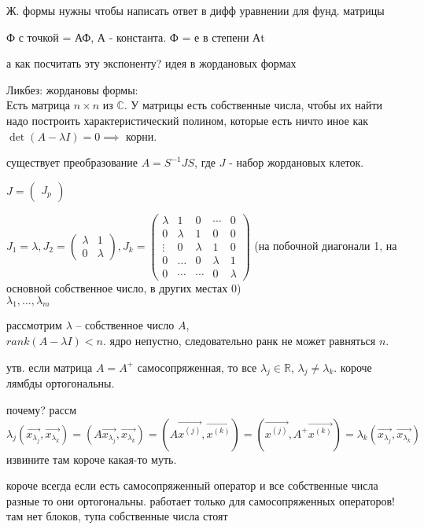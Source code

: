 \documentclass[12pt, a4paper]{article}
\begin{document}
Ж. формы нужны чтобы написать ответ в дифф уравнении для фунд. матрицы

Ф с точкой = АФ, А - константа. Ф = е в степени Аt

а как посчитать эту экспоненту? идея в жордановых формах

Ликбез: жордановы формы:\\

Есть матрица $n\times n$ из $\mathbb{C}$. У матрицы есть собственные числа, чтобы их найти надо построить характеристический полином, которые есть ничто иное как $\det (A - \lambda I) = 0 \implies $ корни. 

существует преобразование $A = S^{-1}JS$, где $J$ - набор жордановых клеток.

$J = \left(
\begin{matrix}
J_{p} 
\end{matrix}
\right)
$

$J_1 = \lambda, J_2 = \left(\begin{matrix}
\lambda & 1 \\ 0 & \lambda
\end{matrix}\right), J_k = \left(\begin{matrix}
\lambda & 1 & 0 & \cdots & 0 \\ 
0 & \lambda & 1 & 0 & 0\\
\vdots & 0 & \lambda & 1 & 0\\
0 & \dotsc & 0 & \lambda & 1 \\
0 & \cdots & \cdots & 0 & \lambda
\end{matrix}\right)$ (на побочной диагонали 1, на основной собственное число, в других местах 0)\\

$\lambda_1, \dotsc, \lambda_m$

рассмотрим $\lambda$ -- собственное число $A$,\\
 $rank(A-\lambda I) < n$. ядро непустно, следовательно ранк не может равняться $n$.
 
утв. если матрица $A=A^+$ самосопряженная, то все $\lambda_j \in \mathbb{R}$, $\lambda_j \neq \lambda_k$. короче лямбды ортогональны.

почему? рассм $
\lambda_j(\vec{x_{\lambda_j}}, \vec{x_{\lambda_k}}) = (A\vec{x_{\lambda_j}}, \vec{x_{\lambda_k}}) = (A \vec{x^{(j)}}, \vec{x^{(k)}}) = (\vec{x^{(j)}}, A^+ \vec{x^{(k)}}) = \lambda_k (\vec{x_{\lambda_j}}, \vec{x_{\lambda_k}})
$ 
извините там короче какая-то муть.

короче всегда если есть самосопряженный оператор и все собственные числа разные то они ортогональны. работает только для самосопряженных операторов! там нет блоков, тупа собственные числа стоят
\end{document}
